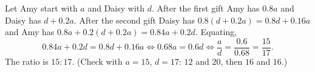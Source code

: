 Let Amy start with $a$ and Daisy with $d$. After the first gift Amy has $0.8a$ and Daisy has $d+0.2a$. After the second gift Daisy has $0.8(d+0.2a)=0.8d+0.16a$ and Amy has $0.8a+0.2(d+0.2a)=0.84a+0.2d$. Equating,
\[
0.84a+0.2d=0.8d+0.16a\iff0.68a=0.6d\iff\dfrac {a}{d}=\dfrac{0.6}{0.68}=\dfrac{15}{17}.
\]
The ratio is $\boxed{15:17}$. (Check with $a=15$, $d=17$: $12$ and $20$, then $16$ and $16$.)
